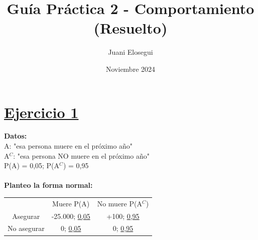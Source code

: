\documentclass{article}
\title{Guía Práctica 2 - Comportamiento (Resuelto)}
\author{Juani Elosegui}
\date{Noviembre 2024}
\newcommand{\ulcolor}[2][Red]{\setulcolor{#1}\ul{#2}}
\begin{document}
    
    \maketitle

    \section*{\underline{Ejercicio 1}}
        \textbf{Datos:}
        \\
        A: "esa persona muere en el próximo año"
        \\
        A$^{C}$: "esa persona NO muere en el próximo año"
        \\
        P(A) = 0,05; P(A$^{C}$) = 0,95
        \\
        \\
        \textbf{Planteo la forma normal:}
            \begin{table}[h]
                \begin{tabular}{ccc}
                    & Muere P(A) & No muere P(A$^{C}$) \\
                    Asegurar & -25.000; \ulcolor[Red]{0,05} & +100; \ulcolor[Red]{0,95} \\
                    No asegurar & 0; \ulcolor[Red]{0,05} & 0; \ulcolor[Red]{0,95} \\
                \end{tabular}
            \end{table}
        
\end{document}
